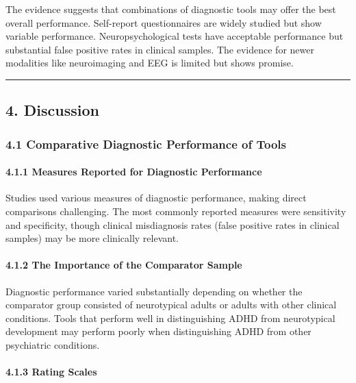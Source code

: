 \documentclass[
  12pt,
  letterpaper,
]{article}
\renewcommand{\[}{\begin{singlespace}\oldDisplayMath}
\renewcommand{\]}{\endoldDisplayMath\end{singlespace}\vspace{\baselineskip}}
\begin{document}
The evidence suggests that combinations of diagnostic tools may offer
the best overall performance. Self-report questionnaires are widely
studied but show variable performance. Neuropsychological tests have
acceptable performance but substantial false positive rates in clinical
samples. The evidence for newer modalities like neuroimaging and EEG is
limited but shows promise.

\begin{center}\rule{0.5\linewidth}{0.5pt}\end{center}

\subsection{4. Discussion}\label{discussion}

\subsubsection{4.1 Comparative Diagnostic Performance of
Tools}\label{comparative-diagnostic-performance-of-tools}

\paragraph{4.1.1 Measures Reported for Diagnostic
Performance}\label{measures-reported-for-diagnostic-performance}

Studies used various measures of diagnostic performance, making direct
comparisons challenging. The most commonly reported measures were
sensitivity and specificity, though clinical misdiagnosis rates (false
positive rates in clinical samples) may be more clinically relevant.

\paragraph{4.1.2 The Importance of the Comparator
Sample}\label{the-importance-of-the-comparator-sample}

Diagnostic performance varied substantially depending on whether the
comparator group consisted of neurotypical adults or adults with other
clinical conditions. Tools that perform well in distinguishing ADHD from
neurotypical development may perform poorly when distinguishing ADHD
from other psychiatric conditions.

\paragraph{4.1.3 Rating Scales}\label{rating-scales}
\end{document}

